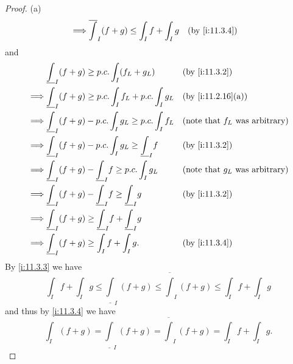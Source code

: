 \begin{proof}{(a)}
\begin{align*}
    \implies & \overline{\int}_I (f + g) \leq \int_I f + \int_I g                       &   & \by{i:11.3.4}
  \end{align*}
  and
  \begin{align*}
             & \underline{\int}_I (f + g) \geq p.c. \int_I (f_L + g_L)                     &   & \by{i:11.3.2}                            \\
    \implies & \underline{\int}_I (f + g) \geq p.c. \int_I f_L + p.c. \int_I g_L           &   & \by{i:11.2.16}[a]                        \\
    \implies & \underline{\int}_I (f + g) - p.c. \int_I g_L \geq p.c. \int_I f_L           &   & \text{(note that \(f_L\) was arbitrary)} \\
    \implies & \underline{\int}_I (f + g) - p.c. \int_I g_L \geq \underline{\int}_I f      &   & \by{i:11.3.2}                            \\
    \implies & \underline{\int}_I (f + g) - \underline{\int}_I f \geq p.c. \int_I g_L      &   & \text{(note that \(g_L\) was arbitrary)} \\
    \implies & \underline{\int}_I (f + g) - \underline{\int}_I f \geq \underline{\int}_I g &   & \by{i:11.3.2}                            \\
    \implies & \underline{\int}_I (f + g) \geq \underline{\int}_I f + \underline{\int}_I g &                                              \\
    \implies & \underline{\int}_I (f + g) \geq \int_I f + \int_I g.                        &   & \by{i:11.3.4}
  \end{align*}
  By \cref{i:11.3.3} we have
  \[
    \int_I f + \int_I g \leq \underline{\int}_I (f + g) \leq \overline{\int}_I (f + g) \leq \int_I f + \int_I g
  \]
  and thus by \cref{i:11.3.4} we have
  \[
    \int_I (f + g) = \underline{\int}_I (f + g) = \overline{\int}_I (f + g) = \int_I f + \int_I g.
  \]
\end{proof}

